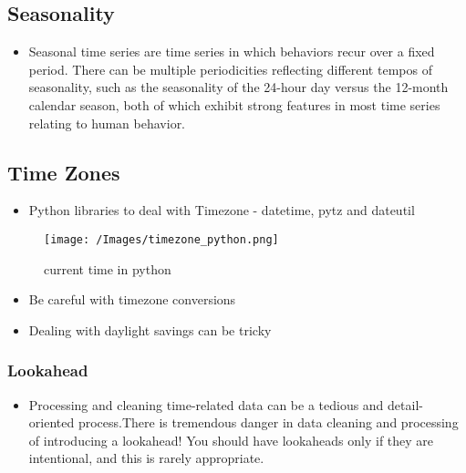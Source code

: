 \documentclass[
  letterpaper,
  DIV=11,
  numbers=noendperiod]{scrartcl}
\providecommand{\tightlist}{%
  \setlength{\itemsep}{0pt}\setlength{\parskip}{0pt}}\usepackage{longtable,booktabs,array}
\begin{document}
\hypertarget{seasonality}{%
\subsection{Seasonality}\label{seasonality}}

\begin{itemize}
\tightlist
\item
  Seasonal time series are time series in which behaviors recur over a
  fixed period. There can be multiple periodicities reflecting different
  tempos of seasonality, such as the seasonality of the 24-hour day
  versus the 12-month calendar season, both of which exhibit strong
  features in most time series relating to human behavior.
\end{itemize}

\hypertarget{time-zones}{%
\subsection{Time Zones}\label{time-zones}}

\begin{itemize}
\tightlist
\item
  Python libraries to deal with Timezone - datetime, pytz and dateutil
\end{itemize}

\begin{figure}

{\centering \texttt{[image: /Images/timezone\_python.png]}

}

\caption{current time in python}

\end{figure}

\begin{itemize}
\tightlist
\item
  Be careful with timezone conversions
\item
  Dealing with daylight savings can be tricky
\end{itemize}

\hypertarget{lookahead}{%
\subsubsection{Lookahead}\label{lookahead}}

\begin{itemize}
\tightlist
\item
  Processing and cleaning time-related data can be a tedious and
  detail-oriented process.There is tremendous danger in data cleaning
  and processing of introducing a lookahead! You should have lookaheads
  only if they are intentional, and this is rarely appropriate.
\end{itemize}
\end{document}
